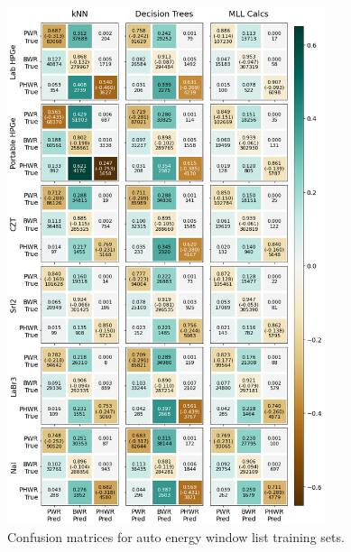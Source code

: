 \begin{figure}[!htbp]
  \centering
  \includegraphics[width=0.83\textwidth]{./chapters/exp2/confusion_matrix_6dets_auto.png}
  \caption[Confusion matrices for auto energy window list training sets.]
          {Confusion matrices for auto energy window list training sets.}
  \label{fig:cm_auto}
\end{figure}

